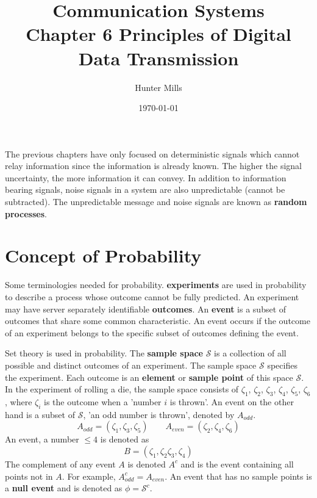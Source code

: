 \documentclass{article}
\title{Communication Systems \\
    \large Chapter 6 Principles of Digital Data Transmission }
\author{Hunter Mills}
\date{\today}
\begin{document}
    \maketitle

    \medskip
        
    The previous chapters have only focused on deterministic signals which cannot relay information since
    the information is already known. The higher the signal uncertainty, the more information it can convey. 
    In addition to information bearing signals, noise signals in a system are also unpredictable (cannot be 
    subtracted). The unpredictable message and noise signals are known as \textbf{random processes}.

    \section{Concept of Probability}
    Some terminologies needed for probability. \textbf{experiments} are used in probability to describe a process
    whose outcome cannot be fully predicted. An experiment may have server separately identifiable \textbf{
    outcomes}. An \textbf{event} is a subset of outcomes that share some common characteristic. An event 
    occurs if the outcome of an experiment belongs to the specific subset of outcomes defining the event.

    Set theory is used in probability. The \textbf{sample space} $\mathcal{S}$ is a collection of all
    possible and distinct outcomes of an experiment. The sample space $\mathcal{S}$ specifies the 
    experiment. Each outcome is an \textbf{element} or \textbf{sample point} of this space $\mathcal{S}$.
    In the experiment of rolling a die, the sample space consists of $\zeta_1$, $\zeta_2$, $\zeta_3$, 
    $\zeta_4$, $\zeta_5$, $\zeta_6$, where $\zeta_i$ is the outcome when a 'number $i$ is thrown'. An
    event on the other hand is a subset of $\mathcal{S}$, 'an odd number is thrown', denoted by $A_{odd}$.
    \begin{equation}
        A_{odd} = (\zeta_1, \zeta_3, \zeta_5) \quad\quad A_{even} = (\zeta_2, \zeta_4, \zeta_6)
    \end{equation}
    An event, a number $\le 4$ is denoted as
    \begin{equation}
        B =  (\zeta_1, \zeta_2 \zeta_3, \zeta_4)
    \end{equation}
    The complement of any event $A$ is denoted $A^c$ and is the event containing all points not in $A$. 
    For example, $A_{odd}^c = A_{even}$. An event that has no sample points is a \textbf{null event} and is
    denoted as $\phi = \mathcal{S}^c$.
\end{document}
